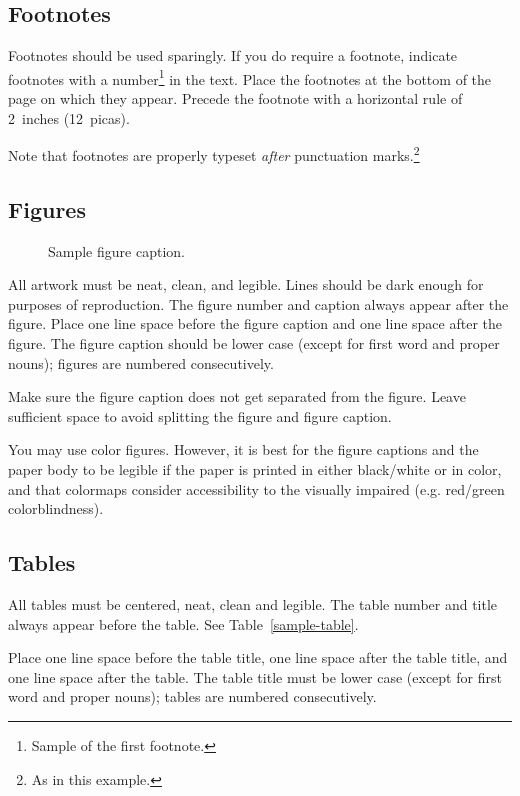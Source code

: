 \documentclass{article}
\begin{document}
\subsection{Footnotes}

Footnotes should be used sparingly.  If you do require a footnote, indicate
footnotes with a number\footnote{Sample of the first footnote.} in the
text. Place the footnotes at the bottom of the page on which they appear.
Precede the footnote with a horizontal rule of 2~inches (12~picas).

Note that footnotes are properly typeset \emph{after} punctuation
marks.\footnote{As in this example.}

\subsection{Figures}

\begin{figure}
  \centering
  \fbox{\rule[-.5cm]{0cm}{4cm} \rule[-.5cm]{4cm}{0cm}}
  \caption{Sample figure caption.}
\end{figure}

All artwork must be neat, clean, and legible. Lines should be dark enough for
purposes of reproduction. The figure number and caption always appear after the
figure. Place one line space before the figure caption and one line space after
the figure. The figure caption should be lower case (except for first word and
proper nouns); figures are numbered consecutively.

Make sure the figure caption does not get separated from the figure. Leave sufficient space to avoid splitting the figure and figure caption.

You may use color figures.  However, it is best for the figure captions and the
paper body to be legible if the paper is printed in either black/white or in
color, and that colormaps consider accessibility to the visually impaired (e.g. red/green colorblindness).

\subsection{Tables}

All tables must be centered, neat, clean and legible.  The table number and
title always appear before the table.  See Table~\ref{sample-table}.

Place one line space before the table title, one line space after the
table title, and one line space after the table. The table title must
be lower case (except for first word and proper nouns); tables are
numbered consecutively.
\end{document}
